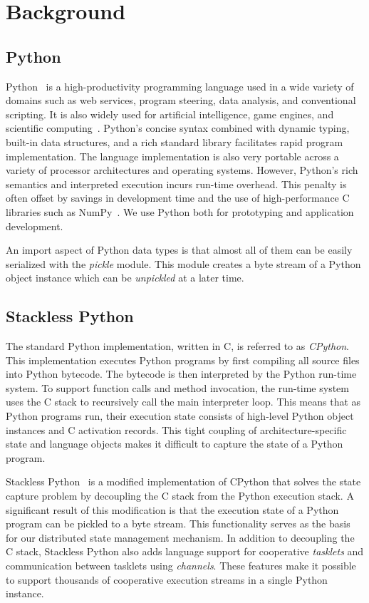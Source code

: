 \section{Background}
\label{sec:Background}

\subsection{Python}

Python~\cite{Python} is a high-productivity programming language used in a
wide variety of domains such as web services, program steering, data analysis,
and conventional scripting. It is also widely used for artificial
intelligence, game engines, and scientific computing~\cite{SciPy}. Python's
concise syntax combined with dynamic typing, built-in data structures, and a
rich standard library facilitates rapid program implementation. The language
implementation is also very portable across a variety of processor
architectures and operating systems. However, Python's rich semantics and
interpreted execution incurs run-time overhead. This penalty is often offset
by savings in development time and the use of high-performance C libraries
such as NumPy~\cite{NumPy:2007}. We use Python both for prototyping and
application development.

An import aspect of Python data types is that almost all of them can be easily serialized with the {\it pickle} module.  This module creates a byte stream of a Python object instance which can be {\it unpickled} at a later time.

\subsection{Stackless Python}
\label{sec:StacklessPython}

The standard Python implementation, written in C, is referred to as {\it
CPython}. This implementation executes Python programs by first
compiling all source files into Python bytecode. The bytecode is then
interpreted by the Python run-time system. To support function calls and
method invocation, the run-time system uses the C stack to recursively
call the main interpreter loop. This means that as Python programs
run, their execution state consists of high-level Python object
instances and C activation records. This tight coupling of
architecture-specific state and language objects makes it difficult to
capture the state of a Python program.

Stackless Python~\cite{Stackless:2007, Tismer:2000:StacklessPython} is a modified implementation of CPython that solves the state capture problem by decoupling the C stack from the Python execution stack.  A significant result of this modification is that the execution state of a Python program can be pickled to a byte stream.  This functionality serves as the basis for our distributed state management mechanism.  In addition to decoupling the C stack, Stackless Python also adds language support for cooperative {\it tasklets} and communication between tasklets using {\it channels}.  These features make it possible to support thousands of cooperative execution streams in a single Python instance.

